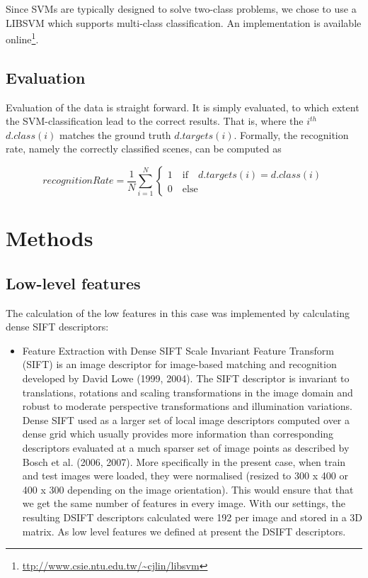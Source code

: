 \documentclass[10pt,twocolumn,letterpaper]{article}
\begin{document}
Since SVMs are typically designed to solve two-class problems, we chose to use a LIBSVM which supports multi-class classification.\cite{Chang} An implementation is available online\footnote{\url{ttp://www.csie.ntu.edu.tw/~cjlin/libsvm}}. 

\subsection{Evaluation}
\label{sec:eval}
Evaluation of the data is straight forward. It is simply evaluated, to which extent the SVM-classification lead to the correct results. That is, where the $i^{th}$ $d.class(i)$ matches the ground truth $d.targets(i)$. Formally, the recognition rate, namely the correctly classified scenes, can be computed as 
\begin{small}

\begin{equation}
	recognitionRate = \frac{1}{N} \sum_{i=1}^{N} \begin{cases}
	1 \quad \text{if} \quad d.targets(i) = d.class(i)\\
	0  \quad \text{else}
	\end{cases}
\end{equation}
\end{small}




\section{Methods}

\subsection{Low-level features}
The calculation of the low features in this case  was implemented by calculating dense SIFT descriptors:
\begin{itemize}
   \item Feature Extraction with Dense SIFT \newline
   Scale Invariant Feature Transform (SIFT) is an image descriptor for image-based matching and recognition developed by David Lowe (1999, 2004). The SIFT descriptor is invariant to translations, rotations and scaling transformations in the image domain and robust to moderate perspective transformations and illumination variations.\cite{shift} Dense SIFT used as a larger set of local image descriptors computed over a dense grid which usually provides more information than corresponding descriptors evaluated at a much sparser set of image points as described by Bosch et al. (2006, 2007). More specifically in the present case, when train and test images were loaded, they were normalised (resized to 300 x 400 or 400 x 300 depending on the image orientation). This would ensure that that we get the same number of features in every image. With our settings, the resulting DSIFT descriptors calculated were 192 per image and stored in a 3D matrix. As low level features we defined at present the DSIFT descriptors.\cite{bosch}
\end{itemize}
\end{document}
